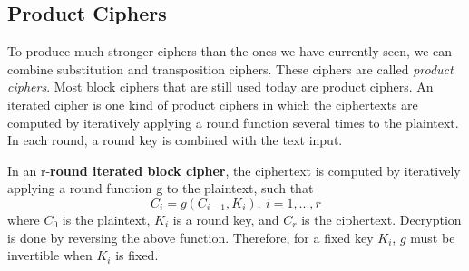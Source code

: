 \subsection{Product Ciphers}
To produce much stronger ciphers than the ones we have currently seen, we can combine substitution and transposition ciphers. These ciphers are called \textit{product ciphers}. Most block ciphers that are still used today are product ciphers. An iterated cipher is one kind of product ciphers in which the ciphertexts are computed by iteratively applying a round function several times to the plaintext. In each round, a round key is combined with the text input.
\begin{mydef}
	In an r-\textbf{round iterated block cipher}, the ciphertext is computed by iteratively applying a round function g to the plaintext, such that$$C_{i} = g(C_{i-1},K_{i}),\ i = 1,...,r$$ where $C_{0}$ is the plaintext, $K_{i}$ is a round key, and $C_{r}$ is the ciphertext. Decryption is done by reversing the above function. Therefore, for a fixed key $K_{i}$, $g$ must be invertible when $K_{i}$ is fixed.
\end{mydef}

